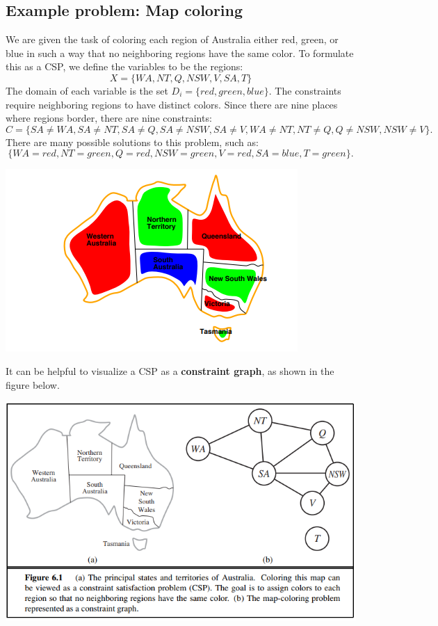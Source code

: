 \subsection{Example problem: Map coloring}
We are given the task of coloring each region of Australia  either red, green, or blue in such a way that no neighboring regions have the same color. To formulate this as a CSP, we define the variables to be the regions:
\[X = \{WA, NT, Q, NSW ,V, SA, T\}\]
The domain of each variable is the set $D_i = \{red, green, blue\}$. The constraints require neighboring regions to have distinct colors. Since there are nine places where regions border, there are nine constraints:
\[C = \{SA \neq WA, SA \neq NT, SA \neq Q, SA \neq NSW , SA \neq V,
WA \neq NT, NT \neq Q, Q \neq NSW , NSW \neq V \} .\]
There are many possible solutions to this problem, such as:
\[\{WA = red, NT = green, Q = red, NSW = green, V = red, SA = blue, T = green \}.\]
\begin{center}
    \includegraphics[]{images/CSP.png}
\end{center}
It can be helpful to visualize a CSP as a \textbf{constraint graph}, as shown in the figure below.
\begin{center}
    \includegraphics[scale=0.8]{images/CSP-constraint-graph.png}
\end{center}

